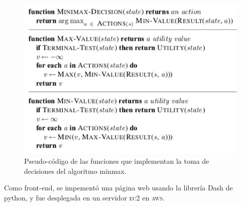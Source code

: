 \documentclass[11pt]{article}
\begin{document}
\begin{figure}
\begin{center}
\includegraphics[scale=.4]{imagenes/busqueda-minmax}
\end{center}
\caption{Pseudo-código de las funciones que implementan la toma de decisiones del algoritmo minmax.}\label{fig:minmax}
\end{figure}

Como front-end, se impementó una página web usando la librería Dash de python, y fue desplegada en un servidor \textsc{ec2} en \textsc{aws}.
\end{document}
